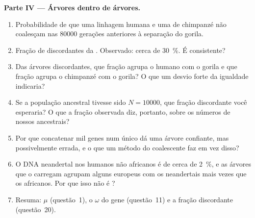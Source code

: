 \begin{problem}
\medskip
\noindent\textbf{Parte IV --- Árvores dentro de árvores.}
\begin{enumerate}[resume]
  \item Probabilidade de que uma linhagem humana e uma de chimpanzé não
        coalesçam nas \num{80000} gerações anteriores à separação do
        gorila.
  \item Fração de  discordantes da .
        Observado: cerca de \qty{30}{\%}. É consistente?
  \item Das árvores discordantes, que fração agrupa o humano com o gorila
        e que fração agrupa o chimpanzé com o gorila? O que um desvio
        forte da igualdade indicaria?
  \item Se a população ancestral tivesse sido $N = \num{10000}$, que
        fração discordante você esperaria? O que a fração observada diz,
        portanto, sobre os números de nossos ancestrais?
  \item Por que concatenar mil genes num único  dá uma árvore
        confiante, mas possivelmente errada, e o que um método do
        coalescente faz em vez disso?
  \item O DNA neandertal nos humanos não africanos é de cerca de
        \qty{2}{\%}, e as árvores que o carregam agrupam alguns europeus
        com os neandertais mais vezes que os africanos. Por que isso não é
        ?
  \item Resuma: $\mu$ (questão~1), o $\omega$ do gene (questão~11) e a
        fração discordante (questão~20).
\end{enumerate}
\end{problem}
